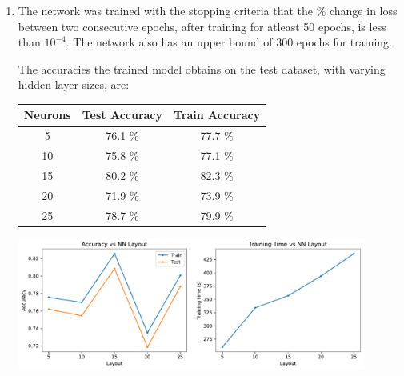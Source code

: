 \documentclass[12pt]{article}
\begin{document}
\begin{enumerate}[label=(\alph*)]
    \item The network was trained with the stopping criteria that the \% change
    in loss between two consecutive epochs, after training for atleast 50 epochs,
    is less than $10^{-4}$. The network also has an upper bound of 300 epochs 
    for training. 

    The accuracies the trained model obtains on the test dataset, with varying 
    hidden layer sizes, are:
    \begin{center}
        \begin{tabular}{|c|c|c|}
            \hline
            Neurons & Test Accuracy & Train Accuracy\\ 
            \hline 
            5  & 76.1 \% & 77.7 \% \\
            10 & 75.8 \% & 77.1 \% \\
            15 & 80.2 \% & 82.3 \% \\
            20 & 71.9 \% & 73.9 \% \\
            25 & 78.7 \% & 79.9 \% \\
            \hline
        \end{tabular}
    \end{center}

    \begin{center}
        \includegraphics[width=0.9\textwidth]{../Q2/single_layer_sigmoid/acc_time.pdf}
    \end{center}


\end{enumerate}
\end{document}
